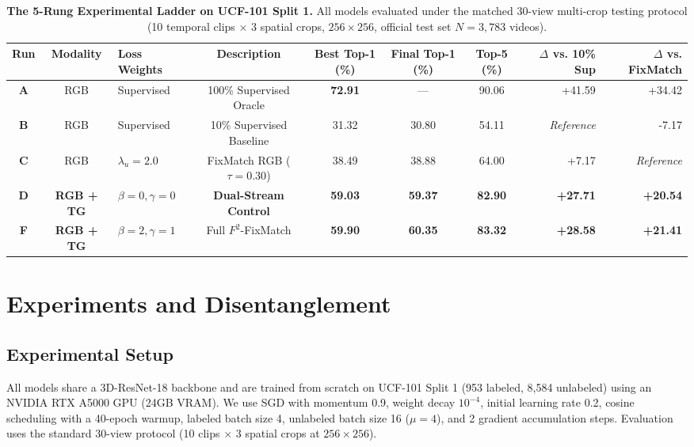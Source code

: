 \documentclass[10pt,twocolumn,letterpaper]{article}
\begin{document}
\begin{table}[t]
\centering
\small
\caption{\textbf{The 5-Rung Experimental Ladder on UCF-101 Split 1.} All models evaluated under the matched 30-view multi-crop testing protocol (10 temporal clips $\times$ 3 spatial crops, $256 \times 256$, official test set $N = 3,783$ videos).}
\label{tab:main_ladder}
\begin{tabular}{@{}cclccccrr@{}}
\toprule
\textbf{Run} & \textbf{Modality} & \textbf{Loss Weights} & \textbf{Description} & \textbf{Best Top-1 (\%)} & \textbf{Final Top-1 (\%)} & \textbf{Top-5 (\%)} & \textbf{$\Delta$ vs. 10\% Sup} & \textbf{$\Delta$ vs. FixMatch} \\
\midrule
\textbf{A} & RGB & Supervised & 100\% Supervised Oracle & \textbf{72.91} & — & 90.06 & +41.59 & +34.42 \\
\textbf{B} & RGB & Supervised & 10\% Supervised Baseline & 31.32 & 30.80 & 54.11 & \textit{Reference} & -7.17 \\
\textbf{C} & RGB & $\lambda_u=2.0$ & FixMatch RGB ($\tau=0.30$) & 38.49 & 38.88 & 64.00 & +7.17 & \textit{Reference} \\
\textbf{D} & \textbf{RGB + TG} & $\beta=0, \gamma=0$ & \textbf{Dual-Stream Control} & \textbf{59.03} & \textbf{59.37} & \textbf{82.90} & \textbf{+27.71} & \textbf{+20.54} \\
\textbf{F} & \textbf{RGB + TG} & $\beta=2, \gamma=1$ & Full $F^2$-FixMatch & \textbf{59.90} & \textbf{60.35} & \textbf{83.32} & \textbf{+28.58} & \textbf{+21.41} \\
\bottomrule
\end{tabular}
\end{table}

\section{Experiments and Disentanglement}
\label{sec:experiments}

\subsection{Experimental Setup}
All models share a 3D-ResNet-18 backbone and are trained from scratch on UCF-101 Split 1 (953 labeled, 8,584 unlabeled) using an NVIDIA RTX A5000 GPU (24GB VRAM). We use SGD with momentum 0.9, weight decay $10^{-4}$, initial learning rate 0.2, cosine scheduling with a 40-epoch warmup, labeled batch size 4, unlabeled batch size 16 ($\mu=4$), and 2 gradient accumulation steps. Evaluation uses the standard 30-view protocol (10 clips $\times$ 3 spatial crops at $256 \times 256$).
\end{document}
